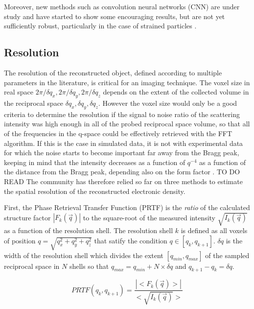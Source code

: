 Moreover, new methods such as convolution neural networks (CNN) are under study and have started to show some encouraging results, but are not yet sufficiently robust, particularly in the case of strained particles \parencite{cherukara_real-time_2018,chan_rapid_2021,Wu2021a}.

\subsection{Resolution}

The resolution of the reconstructed object, defined according to multiple parameters in the literature, is critical for an imaging technique.
The voxel size in real space $2\pi / \delta q_x, 2\pi / \delta q_y, 2\pi / \delta q_z$ depends on the extent of the collected volume in the reciprocal space $\delta q_x, \delta q_y, \delta q_z$.
However the voxel size would only be a good criteria to determine the resolution if the signal to noise ratio of the scattering intensity was high enough in all of the probed reciprocal space volume, so that all of the frequencies in the q-space could be effectively retrieved with the FFT algorithm.
If this is the case in simulated data, it is not with experimental data for which the noise starts to become important far away from the Bragg peak, keeping in mind that the intensity decreases as a function of $q^{-4}$ \parencite{Marchesini2003a} as a function of the distance from the Bragg peak, depending also on the form factor \parencite{croset_form_2017}.
TO DO READ
The community has therefore relied so far on three methods to estimate the spatial resolution of the reconstructed electronic density.

First, the Phase Retrieval Transfer Function (PRTF) \parencite{chapman_high-resolution_2006} is the \textit{ratio} of the calculated structure factor $|F_k(\vec{q})|$ to the square-root of the measured intensity $\sqrt{I_k(\vec{q})}$ as a function of the resolution shell.
The resolution shell $k$ is defined as all voxels of position $q=\sqrt{q_x^2 + q_y^2 +q_z^2}$ that satify the condition $q \in [q_k, q_{k+1}]$.
$\delta q$ is the width of the resolution shell which divides the extent $[q_{min}, q_{max}]$ of the sampled reciprocal space in $N$ shells so that $q_{max} = q_{min} + N \times \delta q$ and $q_{k+1} - q_{k} = \delta q$.

\begin{equation}
    PRTF(q_k, q_{k+1}) = \frac{|<F_k(\vec{q})>|}{<\sqrt{I_k(\vec{q})}>}
\end{equation}

